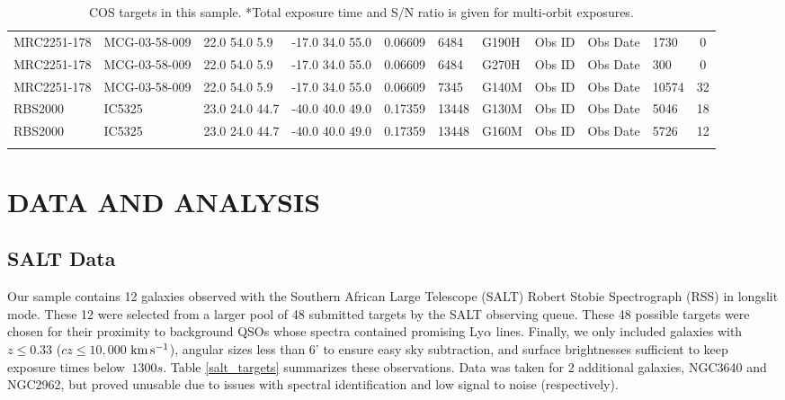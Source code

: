 \documentclass[iop]{emulateapj-rtx4}
\newcommand{\kms}{$\rm km\, s^{-1}$}
\begin{document}
\begin{table}[ht]
\begin{center}
\begin{tabular}{l l l l l l l l l l c}
MRC2251-178  &             MCG-03-58-009  & 22.0  54.0  5.9  &    -17.0  34.0  55.0  &   0.06609  & 6484  &    G190H  &   Obs ID  & Obs Date  & 1730  &       0            \\
MRC2251-178  &             MCG-03-58-009  & 22.0  54.0  5.9  &    -17.0  34.0  55.0  &   0.06609  & 6484  &    G270H  &   Obs ID  & Obs Date  & 300  &        0            \\
MRC2251-178  &             MCG-03-58-009  & 22.0  54.0  5.9  &    -17.0  34.0  55.0  &   0.06609  & 7345  &    G140M  &   Obs ID  & Obs Date  & 10574  &      32           \\
RBS2000  &                 IC5325  &        23.0  24.0  44.7  &   -40.0  40.0  49.0  &   0.17359  & 13448  &   G130M  &   Obs ID  & Obs Date  & 5046  &       18           \\
RBS2000  &                 IC5325  &        23.0  24.0  44.7  &   -40.0  40.0  49.0  &   0.17359  & 13448  &   G160M  &   Obs ID  & Obs Date  & 5726  &       12           \\


 \\
\hline

\end{tabular}
\end{center}
  \caption{\small{COS targets in this sample. *Total exposure time and S/N ratio is given for multi-orbit exposures.}}
  \label{target_table}
\end{table}


\section{DATA AND ANALYSIS}

\subsection{SALT Data}
Our sample contains 12 galaxies observed with the Southern African Large Telescope (SALT) Robert Stobie Spectrograph (RSS) in longslit mode. These 12 were selected from a larger pool of 48 submitted targets by the SALT observing queue. These 48 possible targets were chosen for their proximity to background QSOs whose spectra contained promising Ly$\alpha$ lines. Finally, we only included galaxies with $z \leq 0.33$ ($cz \leq 10,000$ \kms), angular sizes less than 6' to ensure easy sky subtraction, and surface brightnesses sufficient to keep exposure times below $~1300 s$. Table \ref{salt_targets} summarizes these observations. Data was taken for 2 additional galaxies, NGC3640 and NGC2962, but proved unusable due to issues with spectral identification and low signal to noise (respectively).
\end{document}
